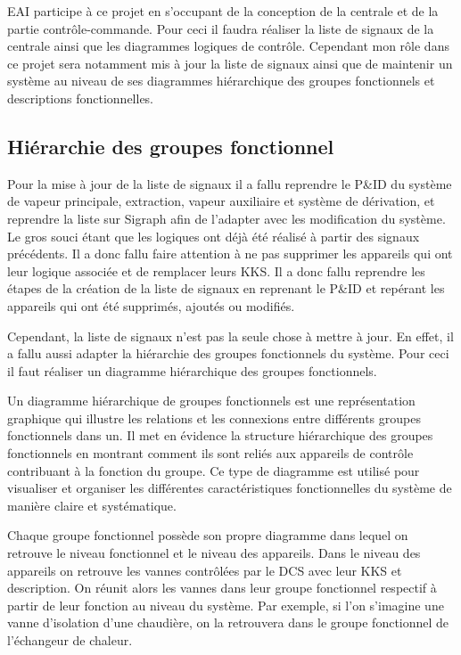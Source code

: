 \documentclass[11pt, openright]{book}
\begin{document}
EAI participe à ce projet en s'occupant de la conception de la centrale et de la partie contrôle-commande. Pour ceci il faudra réaliser la liste de signaux de la centrale ainsi que les diagrammes logiques de contrôle. Cependant mon rôle dans ce projet sera notamment mis à jour la liste de signaux ainsi que de maintenir un système au niveau de ses diagrammes hiérarchique des groupes fonctionnels et descriptions fonctionnelles.

\subsection{Hiérarchie des groupes fonctionnel}

Pour la mise à jour de la liste de signaux il a fallu reprendre le P\&ID du système de vapeur principale, extraction, vapeur auxiliaire et système de dérivation,
et reprendre la liste sur Sigraph afin de l'adapter avec les modification du système. Le gros souci étant que les logiques ont déjà été réalisé à partir des signaux précédents. Il a donc fallu faire attention à ne pas supprimer les appareils qui ont leur logique associée et de remplacer leurs KKS. Il a donc fallu reprendre les étapes de la création de la liste de signaux en reprenant le P\&ID et repérant les appareils qui ont été supprimés, ajoutés ou modifiés.

Cependant, la liste de signaux n'est pas la seule chose à mettre à jour. En effet, il a fallu aussi adapter la hiérarchie des groupes fonctionnels du système. Pour ceci il faut réaliser un diagramme hiérarchique des groupes fonctionnels.

Un diagramme hiérarchique de groupes fonctionnels est une représentation graphique qui illustre les relations et les connexions entre différents groupes fonctionnels dans un. Il met en évidence la structure hiérarchique des groupes fonctionnels en montrant comment ils sont reliés aux appareils de contrôle contribuant à la fonction du groupe. Ce type de diagramme est utilisé pour visualiser et organiser les différentes caractéristiques fonctionnelles du système de manière claire et systématique.

Chaque groupe fonctionnel possède son propre diagramme dans lequel on retrouve le niveau fonctionnel et le niveau des appareils. Dans le niveau des appareils on retrouve les vannes contrôlées par le DCS avec leur KKS et description. On réunit alors les vannes dans leur groupe fonctionnel respectif à partir de leur fonction au niveau du système. Par exemple, si l'on s'imagine une vanne d'isolation d'une chaudière, on la retrouvera dans le groupe fonctionnel de l'échangeur de chaleur.
\end{document}

